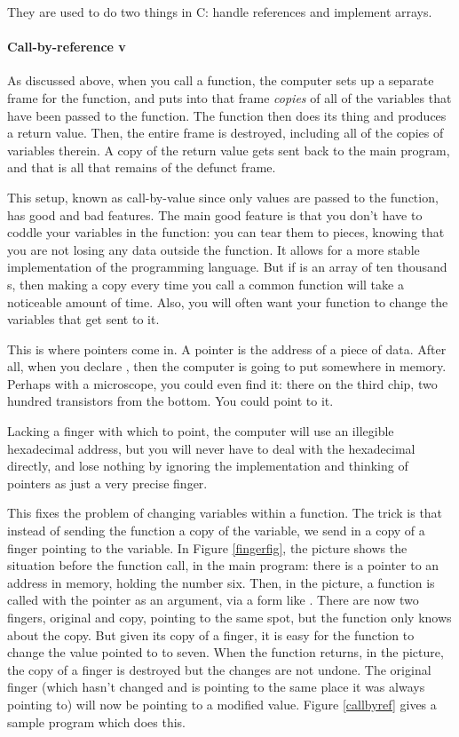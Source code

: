 They are used to do two things in C: handle references and implement arrays.

\paragraph{Call-by-reference v } 
  
As discussed above, when you call a function, the computer sets up a
separate frame for the function, and puts into that frame {\it copies} of
all of the variables that have been passed to the function. The function
then does its thing and produces a return value. Then, the entire frame
is destroyed, including all of the copies of variables therein. A copy
of the return value gets sent back to the main program, and that is all
that remains of the defunct frame.

This setup, known as call-by-value since only values are passed to the
function, has good and bad features. The main good feature is that you
don't have to coddle your variables in the function: you can tear them to
pieces, knowing that you are not losing any data outside the function. It
allows for a more stable implementation of the programming language. But if 
is an array of ten thousand s, then making a copy every time
you call a common function will take a noticeable amount of time. Also,
you will often want your function to change the variables that get
sent to it.

This is where pointers come in. A pointer is the address of a piece of
data. After all, when you declare , then the computer is
going to put  somewhere in memory. Perhaps with a microscope,
you could even find it: there on the third chip, two hundred transistors
from the bottom. You could point to it.

Lacking a finger with which to point, the computer will use
an illegible hexadecimal address, but you will never have to deal with
the hexadecimal directly, and lose nothing by ignoring the implementation
and thinking of pointers as just a very precise finger.

This fixes the problem of changing variables within a function. The
trick is that instead of sending the function a copy of the variable,
we send in a copy of a finger pointing to the variable. 
In Figure \ref{fingerfig}, the  picture shows the situation
before the function call, in the main program: there is a pointer to an
address in memory, holding the number six. Then, in the  picture,
a function is called with the pointer as an argument, via a form like
.
There are now
two fingers, original and copy, pointing to the same spot, but the
function only knows about the copy.  But given its copy of a finger, it
is easy for the function to change the value pointed to to seven. When
the function returns, in the  picture, the copy of a finger is
destroyed but the changes are not undone.  The original finger (which
hasn't changed and is pointing to the same place it was always pointing
to) will now be pointing to a modified value.  Figure \ref{callbyref}
gives a sample program which does this.


